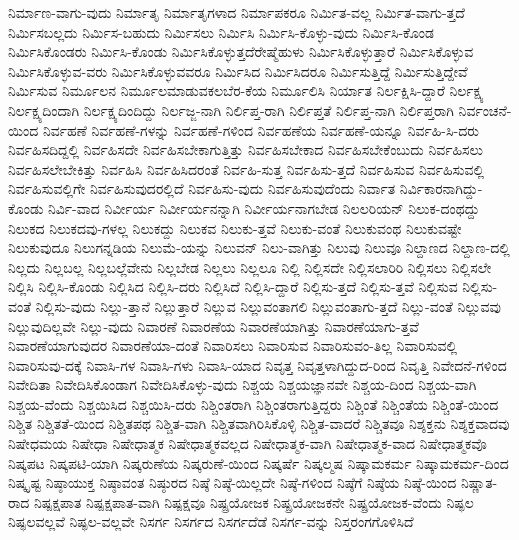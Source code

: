 {ನಿರ್ಮಾಣ-ವಾಗು-ವುದು
ನಿರ್ಮಾತೃ
ನಿರ್ಮಾತೃಗಳಾದ
ನಿರ್ಮಾಪಕರೂ
ನಿರ್ಮಿತ-ವಲ್ಲ
ನಿರ್ಮಿತ-ವಾಗು-ತ್ತದೆ
ನಿರ್ಮಿಸಬಲ್ಲದು
ನಿರ್ಮಿಸ-ಬಹುದು
ನಿರ್ಮಿಸಲು
ನಿರ್ಮಿಸಿ
ನಿರ್ಮಿಸಿ-ಕೊಳ್ಳು-ವುದು
ನಿರ್ಮಿಸಿ-ಕೊಂಡ
ನಿರ್ಮಿಸಿಕೊಂಡರು
ನಿರ್ಮಿಸಿ-ಕೊಂಡು
ನಿರ್ಮಿಸಿಕೊಳ್ಳುತ್ತದೆರೇಷ್ಮೆಹುಳು
ನಿರ್ಮಿಸಿಕೊಳ್ಳುತ್ತಾರೆ
ನಿರ್ಮಿಸಿಕೊಳ್ಳುವ
ನಿರ್ಮಿಸಿಕೊಳ್ಳುವ-ವರು
ನಿರ್ಮಿಸಿಕೊಳ್ಳುವವರೂ
ನಿರ್ಮಿಸಿದ
ನಿರ್ಮಿಸಿದರೂ
ನಿರ್ಮಿಸುತ್ತಿದ್ದೆ
ನಿರ್ಮಿಸುತ್ತಿದ್ದೇವೆ
ನಿರ್ಮಿಸುವ
ನಿರ್ಮೂಲನ
ನಿರ್ಮೂಲಮಾಡುವಕಲಬೆರ-ಕೆಯ
ನಿರ್ಮೂಲಿಸಿ
ನಿರ್ಯಾತ
ನಿರ್ಲಕ್ಷಿಸಿ-ದ್ದಾರೆ
ನಿರ್ಲಕ್ಷ್ಯ
ನಿರ್ಲಕ್ಷ್ಯದಿಂದಾಗಿ
ನಿರ್ಲಕ್ಷ್ಯದಿಂದಿದ್ದು
ನಿರ್ಲಜ್ಜ-ನಾಗಿ
ನಿರ್ಲಿಪ್ತ-ರಾಗಿ
ನಿರ್ಲಿಪ್ತತೆ
ನಿರ್ಲಿಪ್ತ-ನಾಗಿ
ನಿರ್ಲಿಪ್ತರಾಗಿ
ನಿರ್ವಂಚನೆ-ಯಿಂದ
ನಿರ್ವಹಣೆ
ನಿರ್ವಹಣೆ-ಗಳನ್ನು
ನಿರ್ವಹಣೆ-ಗಳಿಂದ
ನಿರ್ವಹಣೆಯ
ನಿರ್ವಹಣೆ-ಯನ್ನೂ
ನಿರ್ವಹಿ-ಸಿ-ದರು
ನಿರ್ವಹಿಸದಿದ್ದಲ್ಲಿ
ನಿರ್ವಹಿಸದೇ
ನಿರ್ವಹಿಸಬೇಕಾಗುತ್ತಿತ್ತು
ನಿರ್ವಹಿಸಬೇಕಾದ
ನಿರ್ವಹಿಸಬೇಕೆಂಬುದು
ನಿರ್ವಹಿಸಲು
ನಿರ್ವಹಿಸಲೇಬೇಕಿತ್ತು
ನಿರ್ವಹಿಸಿ
ನಿರ್ವಹಿಸಿದರಂತೆ
ನಿರ್ವಹಿ-ಸುತ್ತ
ನಿರ್ವಹಿಸು-ತ್ತದೆ
ನಿರ್ವಹಿಸುವ
ನಿರ್ವಹಿಸುವಲ್ಲಿ
ನಿರ್ವಹಿಸುವಲ್ಲಿಗೇ
ನಿರ್ವಹಿಸುವುದರಲ್ಲಿದೆ
ನಿರ್ವಹಿಸು-ವುದು
ನಿರ್ವಹಿಸುವುದೆಂದು
ನಿರ್ವಾತ
ನಿರ್ವಿಕಾರನಾಗಿದ್ದು-ಕೊಂಡು
ನಿರ್ವಿ-ವಾದ
ನಿರ್ವೀರ್ಯ
ನಿರ್ವೀರ್ಯನನ್ನಾಗಿ
ನಿರ್ವೀರ್ಯನಾಗಬೇಡ
ನಿಲಲರಿಯನ್
ನಿಲುಕ-ದಂಥದ್ದು
ನಿಲುಕದ
ನಿಲುಕದವು-ಗಳಲ್ಲ
ನಿಲುಕದ್ದು
ನಿಲುಕವ
ನಿಲುಕು-ತ್ತವೆ
ನಿಲುಕು-ವಂತೆ
ನಿಲುಕುವಂಥ
ನಿಲುಕುವಷ್ಟೇ
ನಿಲುಕುವುದೂ
ನಿಲುಗನ್ನಡಿಯ
ನಿಲುಮೆ-ಯನ್ನು
ನಿಲುವನ್
ನಿಲು-ವಾಗಿತ್ತು
ನಿಲುವು
ನಿಲುವೂ
ನಿಲ್ದಾಣದ
ನಿಲ್ದಾಣ-ದಲ್ಲಿ
ನಿಲ್ಲದು
ನಿಲ್ಲಬಲ್ಲ
ನಿಲ್ಲಬಲ್ಲೆವೇನು
ನಿಲ್ಲಬೇಡ
ನಿಲ್ಲಲು
ನಿಲ್ಲಲೂ
ನಿಲ್ಲಿ
ನಿಲ್ಲಿಸದೇ
ನಿಲ್ಲಿಸಲಾರಿರಿ
ನಿಲ್ಲಿಸಲು
ನಿಲ್ಲಿಸಲೇ
ನಿಲ್ಲಿಸಿ
ನಿಲ್ಲಿಸಿ-ಕೊಂಡು
ನಿಲ್ಲಿಸಿದ
ನಿಲ್ಲಿಸಿ-ದರು
ನಿಲ್ಲಿಸಿದೆ
ನಿಲ್ಲಿಸಿ-ದ್ದಾರೆ
ನಿಲ್ಲಿಸು-ತ್ತದೆ
ನಿಲ್ಲಿಸು-ತ್ತವೆ
ನಿಲ್ಲಿಸುವ
ನಿಲ್ಲಿಸು-ವಂತೆ
ನಿಲ್ಲಿಸು-ವುದು
ನಿಲ್ಲು-ತ್ತಾನೆ
ನಿಲ್ಲುತ್ತಾರೆ
ನಿಲ್ಲುವ
ನಿಲ್ಲುವಂತಾಗಲಿ
ನಿಲ್ಲುವಂತಾಗು-ತ್ತದೆ
ನಿಲ್ಲು-ವಂತೆ
ನಿಲ್ಲುವವು
ನಿಲ್ಲುವುದಿಲ್ಲವೇ
ನಿಲ್ಲು-ವುದು
ನಿವಾರಣೆ
ನಿವಾರಣೆಯ
ನಿವಾರಣೆಯಾಗಿತ್ತು
ನಿವಾರಣೆಯಾಗು-ತ್ತವೆ
ನಿವಾರಣೆಯಾಗುವುದರ
ನಿವಾರಣೆಯಾ-ದಂತೆ
ನಿವಾರಿಸಲು
ನಿವಾರಿಸುವ
ನಿವಾರಿಸುವಂ-ತಿಲ್ಲ
ನಿವಾರಿಸುವಲ್ಲಿ
ನಿವಾರಿಸುವು-ದಕ್ಕೆ
ನಿವಾಸಿ-ಗಳ
ನಿವಾಸಿ-ಗಳು
ನಿವಾಸಿ-ಯಾದ
ನಿವೃತ್ತ
ನಿವೃತ್ತಳಾಗಿದ್ದುದ-ರಿಂದ
ನಿವೃತ್ತಿ
ನಿವೇದನೆ-ಗಳಿಂದ
ನಿವೇದಿತಾ
ನಿವೇದಿಸಿಕೊಂಡಾಗ
ನಿವೇದಿಸಿಕೊಳ್ಳು-ವುದು
ನಿಶ್ಚಯ
ನಿಶ್ಚಯಜ್ಞಾನವೇ
ನಿಶ್ಚಯ-ದಿಂದ
ನಿಶ್ಚಯ-ವಾಗಿ
ನಿಶ್ಚಯ-ವೆಂದು
ನಿಶ್ಚಯಿಸಿದ
ನಿಶ್ಚಯಿಸಿ-ದರು
ನಿಶ್ಚಿಂತರಾಗಿ
ನಿಶ್ಚಿಂತರಾಗುತ್ತಿದ್ದರು
ನಿಶ್ಚಿಂತೆ
ನಿಶ್ಚಿಂತೆಯ
ನಿಶ್ಚಿಂತೆ-ಯಿಂದ
ನಿಶ್ಚಿತ
ನಿಶ್ಚಿತತೆ-ಯಿಂದ
ನಿಶ್ಚಿತಪಥ
ನಿಶ್ಚಿತ-ವಾಗಿ
ನಿಶ್ಚಿತವಾಗಿರಿಸಿಕೊಳ್ಳಿ
ನಿಶ್ಚಿತ-ವಾದರೆ
ನಿಶ್ಚಿತವೂ
ನಿಶ್ಶಕ್ತನು
ನಿಶ್ಶಕ್ತವಾದವು
ನಿಷೇಧಮಯ
ನಿಷೇಧಾ
ನಿಷೇಧಾತ್ಮಕ
ನಿಷೇಧಾತ್ಮಕವಲ್ಲದ
ನಿಷೇಧಾತ್ಮಕ-ವಾಗಿ
ನಿಷೇಧಾತ್ಮಕ-ವಾದ
ನಿಷೇಧಾತ್ಮಕವೊ
ನಿಷ್ಕಪಟ
ನಿಷ್ಕಪಟಿ-ಯಾಗಿ
ನಿಷ್ಕರುಣೆಯ
ನಿಷ್ಕರುಣೆ-ಯಿಂದ
ನಿಷ್ಕರ್ಷೆ
ನಿಷ್ಕಲ್ಮಷ
ನಿಷ್ಕಾಮಕರ್ಮ
ನಿಷ್ಕಾಮಕರ್ಮ-ದಿಂದ
ನಿಷ್ಕೃಷ್ಟ
ನಿಷ್ಠಾಯುಕ್ತ
ನಿಷ್ಠಾವಂತ
ನಿಷ್ಠುರದ
ನಿಷ್ಠೆ
ನಿಷ್ಠೆ-ಯಿಲ್ಲದೇ
ನಿಷ್ಠೆ-ಗಳಿಂದ
ನಿಷ್ಠೆಗೆ
ನಿಷ್ಠೆಯ
ನಿಷ್ಠೆ-ಯಿಂದ
ನಿಷ್ಣಾತ-ರಾದ
ನಿಷ್ಪಕ್ಷಪಾತ
ನಿಷ್ಪಕ್ಷಪಾತ-ವಾಗಿ
ನಿಷ್ಪಕ್ಷವೂ
ನಿಷ್ಪ್ರಯೋಜಕ
ನಿಷ್ಪ್ರಯೋಜಕನೇ
ನಿಷ್ಪ್ರಯೋಜಕ-ವೆಂದು
ನಿಷ್ಫಲ
ನಿಷ್ಫಲವಲ್ಲವೆ
ನಿಷ್ಫಲ-ವಲ್ಲವೇ
ನಿಸರ್ಗ
ನಿಸರ್ಗದ
ನಿಸರ್ಗದೆಡೆ
ನಿಸರ್ಗ-ವನ್ನು
ನಿಸ್ತರಂಗಗೊಳಿಸಿದೆ
}
